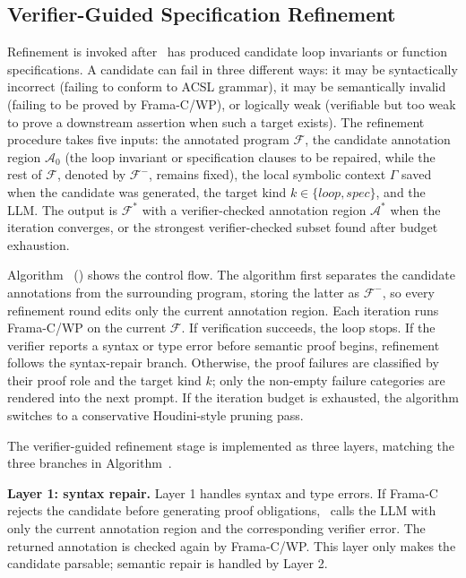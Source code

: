 \subsection{Verifier-Guided Specification Refinement}
\label{sec:refinement}

Refinement is invoked after \toolname\ has produced candidate loop invariants or function specifications. A candidate can fail in three different ways: it may be syntactically incorrect (failing to conform to ACSL grammar), it may be semantically invalid (failing to be proved by Frama-C/WP), or logically weak (verifiable but too weak to prove a downstream assertion when such a target exists). The refinement procedure takes five inputs: the annotated program $\mathcal{F}$, the candidate annotation region $\mathcal{A}_{0}$ (the loop invariant or specification clauses to be repaired, while the rest of $\mathcal{F}$, denoted by $\mathcal{F}^{-}$, remains fixed), the local symbolic context $\Gamma$ saved when the candidate was generated, the target kind $k \in \{\textit{loop},\textit{spec}\}$, and the LLM. The output is $\mathcal{F}^*$ with a verifier-checked annotation region $\mathcal{A}^*$ when the iteration converges, or the strongest verifier-checked subset found after budget exhaustion. 

Algorithm~ () shows the control flow. The algorithm first separates the candidate annotations from the surrounding program, storing the latter as $\mathcal{F}^{-}$, so every refinement round edits only the current annotation region. Each iteration runs Frama-C/WP on the current $\mathcal{F}$. If verification succeeds, the loop stops. If the verifier reports a syntax or type error before semantic proof begins, refinement follows the syntax-repair branch. Otherwise, the proof failures are classified by their proof role and the target kind $k$; only the non-empty failure categories are rendered into the next prompt. If the iteration budget is exhausted, the algorithm switches to a conservative Houdini-style pruning pass. 

The verifier-guided refinement stage is implemented as three layers, matching the three branches in Algorithm~.


\textbf{Layer 1: syntax repair.}
Layer 1 handles syntax and type errors. If Frama-C rejects the candidate before generating proof obligations, \toolname\ calls the LLM with only the current annotation region and the corresponding verifier error. The returned annotation is checked again by Frama-C/WP. This layer only makes the candidate parsable; semantic repair is handled by Layer 2.

